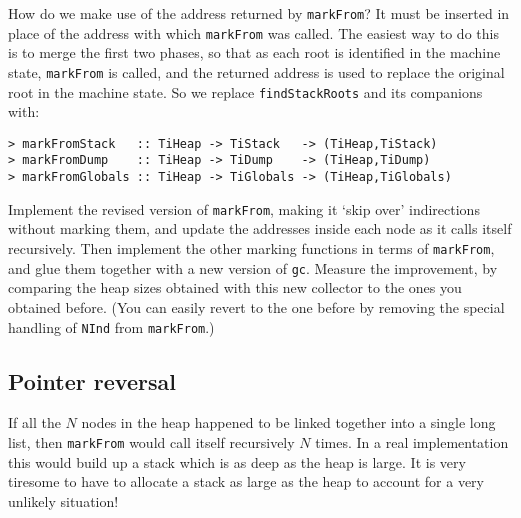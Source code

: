 How do we make use of the address returned by \mbox{\tt markFrom}?
It must be inserted in place
of the address with which \mbox{\tt markFrom} was called.  The easiest way to do
this is to merge the first two phases, so that as each root is identified
in the machine state,
\mbox{\tt markFrom} is called, and the returned address is used to replace the
original root in the machine state.
So we replace \mbox{\tt findStackRoots} and its companions with:
\begin{verbatim}
> markFromStack   :: TiHeap -> TiStack   -> (TiHeap,TiStack)
> markFromDump    :: TiHeap -> TiDump    -> (TiHeap,TiDump)
> markFromGlobals :: TiHeap -> TiGlobals -> (TiHeap,TiGlobals)
\end{verbatim}
%
%
%
\begin{exercise}
Implement the revised version of \mbox{\tt markFrom}, making it `skip over'
indirections without marking them, and update the addresses inside
each node as it calls itself recursively.
Then implement the other marking functions in terms of \mbox{\tt markFrom},
and glue them together
with a new version of \mbox{\tt gc}.
Measure the improvement, by comparing the heap sizes obtained with this
new collector to the ones you obtained before.  (You can easily revert to
the one before by removing the special handling of \mbox{\tt NInd} from
\mbox{\tt markFrom}.)
\end{exercise}

\subsection{Pointer reversal}

If all the $N$ nodes in the heap happened to be linked together into a single
long list, then \mbox{\tt markFrom} would call itself recursively $N$ times.
In a real implementation this would build up a stack which is as deep as the
heap is large.  It is very tiresome to have to allocate a stack as large
as the heap to account for a very unlikely situation!

